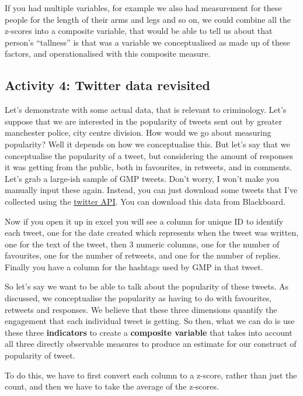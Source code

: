 \documentclass[]{book}
\theoremstyle{definition}
\theoremstyle{definition}
\theoremstyle{definition}
\theoremstyle{remark}
\begin{document}
If you had multiple variables, for example we also had measurement for
these people for the length of their arms and legs and so on, we could
combine all the z-scores into a composite variable, that would be able
to tell us about that person's ``tallness'' is that was a variable we
conceptualised as made up of these factors, and operationalised with
this composite measure.

\hypertarget{activity-4-twitter-data-revisited}{%
\subsection{Activity 4: Twitter data
revisited}\label{activity-4-twitter-data-revisited}}

Let's demonstrate with some actual data, that is relevant to
criminology. Let's suppose that we are interested in the popularity of
tweets sent out by greater manchester police, city centre division. How
would we go about measuring popularity? Well it depends on how we
conceptualise this. But let's say that we conceptualise the popularity
of a tweet, but considering the amount of responses it was getting from
the public, both in favourites, in retweets, and in comments. Let's grab
a large-ish sample of GMP tweets. Don't worry, I won't make you manually
input these again. Instead, you can just download some tweets that I've
collected using the \href{https://developer.twitter.com/en/docs}{twitter
API}. You can download this data from Blackboard.

Now if you open it up in excel you will see a column for unique ID to
identify each tweet, one for the date created which represents when the
tweet was written, one for the text of the tweet, then 3 numeric
columns, one for the number of favourites, one for the number of
retweets, and one for the number of replies. Finally you have a column
for the hashtags used by GMP in that tweet.

So let's say we want to be able to talk about the popularity of these
tweets. As discussed, we conceptualise the popularity as having to do
with favourites, retweets and responses. We believe that these three
dimensions quantify the engagement that each individual tweet is
getting. So then, what we can do is use these three \textbf{indicators}
to create a \textbf{composite variable} that takes into account all
three directly observable measures to produce an estimate for our
construct of popularity of tweet.

To do this, we have to first convert each column to a z-score, rather
than just the count, and then we have to take the average of the
z-scores.
\end{document}
